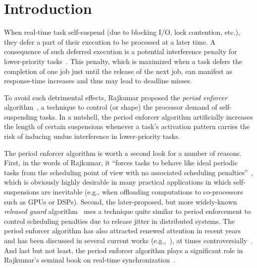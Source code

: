 


\section{Introduction} 
When real-time task self-suspend (due to blocking I/O, lock contention, etc.), they defer a part of their execution to be processed at a later time. A consequence of such deferred execution is a potential interference penalty for lower-priority tasks~\cite{LSS:87,LSST:91,Ra:90,ABRTW:93,SLS:95}. This penalty, which is maximized when a task defers the completion of one job just until the release of the next job, can manifest as response-time increases and thus may lead to deadline misses.

To avoid such detrimental effects,  Rajkumar \cite{Raj:suspension1991} proposed the \emph{period enforcer} algorithm~\cite{Raj:suspension1991},  a technique to control (or shape) the processor demand of self-suspending tasks. In a nutshell, the period enforcer algorithm artificially increases the length of certain suspensions whenever a task's activation pattern carries the risk of inducing undue interference in lower-priority tasks.

The period enforcer algorithm is worth a second look for a number of reasons. First, in the words of Rajkumar, it ``forces tasks to behave like ideal periodic tasks from the scheduling point of view with no associated scheduling penalties''~\cite{Raj:suspension1991}, which is obviously highly desirable in many practical applications in which self-suspensions are inevitable (e.g., when offloading computations to co-processors such as GPUs or DSPs). Second, the later-proposed, but more widely-known \emph{released guard} algorithm~\cite{SL:96} uses a technique quite similar to period enforcement to control scheduling penalties due to release jitter in distributed systems. The period enforcer algorithm has also attracted renewed attention in recent years and has been discussed in several current works  (e.g.,~\cite{LNR:09,LR:10,Lak:11,LC:14,KANR:13,HY:11,CA:09,CA:10,CA:10b}), at times controversially~\cite{BA:08a}. And last but not least, the period enforcer algorithm plays a significant role in Rajkumar's seminal book on   real-time  synchronization~\cite{Raj:91}. 

